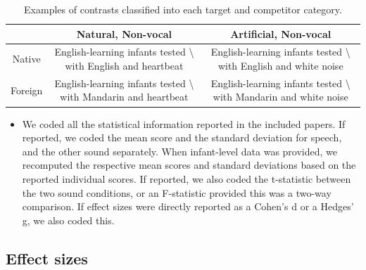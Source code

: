 \documentclass[
  man,mask,floatsintext]{apa6}
\providecommand{\tightlist}{%
  \setlength{\itemsep}{0pt}\setlength{\parskip}{0pt}}
\begin{document}
\begin{table}[tbp]

\begin{center}
\begin{threeparttable}

\caption{\label{tab:TableStim}Examples of contrasts classified into each target and competitor category.}

\begin{tabular}{ccc}
\toprule
 & \multicolumn{1}{c}{Natural, Non-vocal} & \multicolumn{1}{c}{Artificial, Non-vocal}\\
\midrule
Native & English-learning infants tested \textbackslash{} with English and heartbeat & English-learning infants tested \textbackslash{} with English and white noise\\
Foreign & English-learning infants tested \textbackslash{} with Mandarin and heartbeat & English-learning infants tested \textbackslash{} with Mandarin and white noise\\
\bottomrule
\end{tabular}

\end{threeparttable}
\end{center}

\end{table}

\begin{itemize}
\tightlist
\item
  We coded all the statistical information reported in the included papers. If reported, we coded the mean score and the standard deviation for speech, and the other sound separately. When infant-level data was provided, we recomputed the respective mean scores and standard deviations based on the reported individual scores. If reported, we also coded the t-statistic between the two sound conditions, or an F-statistic provided this was a two-way comparison. If effect sizes were directly reported as a Cohen's d or a Hedges' g, we also coded this.
\end{itemize}

\hypertarget{effect-sizes}{%
\subsection{Effect sizes}\label{effect-sizes}}
\end{document}
